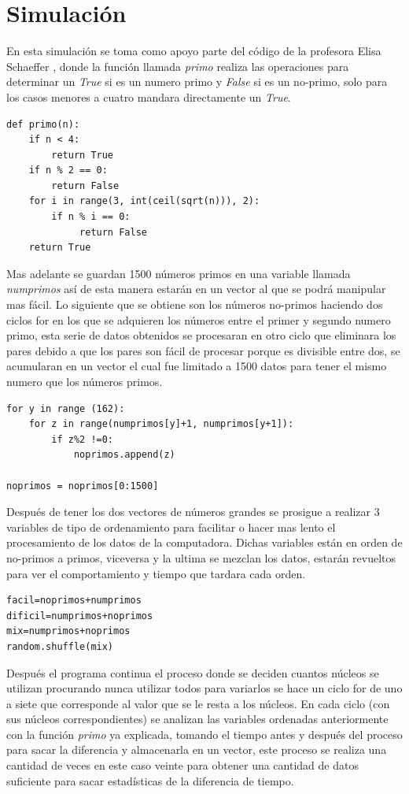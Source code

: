 \documentclass[a4paper, 11pt]{article}
\begin{document}
\section{Simulación}
En esta simulación se toma como apoyo parte del código de la profesora Elisa Schaeffer \cite{dra}, donde la función llamada \textit{primo} realiza las operaciones para determinar un \textit{True} si es un numero primo y \textit{False} si es un no-primo, solo para los casos menores a cuatro mandara directamente un \textit{True}.
\begin{verbatim}
def primo(n):
    if n < 4:
        return True
    if n % 2 == 0:
        return False
    for i in range(3, int(ceil(sqrt(n))), 2):
        if n % i == 0:
             return False
    return True
\end{verbatim}
Mas adelante se guardan 1500 números primos en una variable llamada \textit{numprimos} así de esta manera estarán en un vector al que se podrá manipular mas fácil.
Lo siguiente que se obtiene son los números no-primos haciendo dos ciclos for en los que se adquieren los números entre el primer y segundo numero primo, esta serie de datos obtenidos se procesaran en otro ciclo que eliminara los pares debido a que los pares son fácil de procesar porque es divisible entre dos, se acumularan en un vector el cual fue limitado a 1500 datos para tener el mismo numero que los números primos.
\begin{verbatim}
for y in range (162):
    for z in range(numprimos[y]+1, numprimos[y+1]):
        if z%2 !=0:
            noprimos.append(z)
            
noprimos = noprimos[0:1500]
\end{verbatim}
Después de tener los dos vectores de números grandes se prosigue a realizar 3 variables de tipo de ordenamiento para facilitar o hacer mas lento el procesamiento de los datos de la computadora. Dichas variables están en orden de no-primos a primos, viceversa y la ultima se mezclan los datos, estarán revueltos para ver el comportamiento y tiempo que tardara cada orden.
\begin{verbatim}
facil=noprimos+numprimos
dificil=numprimos+noprimos
mix=numprimos+noprimos
random.shuffle(mix)   
\end{verbatim}
Después el programa continua el proceso donde se deciden cuantos núcleos se utilizan procurando nunca utilizar todos para variarlos se hace un ciclo for de uno a siete que corresponde al valor que se le resta a los núcleos. En cada ciclo (con sus núcleos correspondientes) se analizan las variables ordenadas anteriormente con la función \textit{primo} ya explicada, tomando el tiempo antes y después del proceso para sacar la diferencia y almacenarla en un vector, este proceso se realiza una cantidad de veces en este caso veinte para obtener una cantidad de datos suficiente para sacar estadísticas de la diferencia de tiempo.
\end{document}
